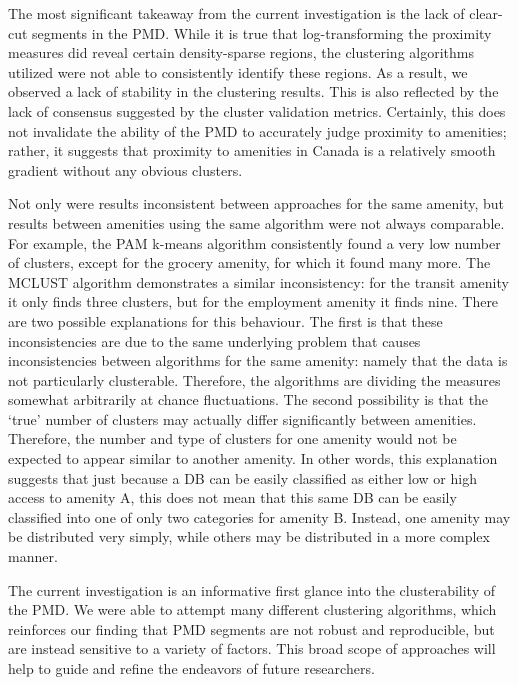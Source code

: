 \documentclass[11pt, a4paper]{article}
\begin{document}
The most significant takeaway from the current investigation is the lack of clear-cut segments in the PMD. While it is true that log-transforming the proximity measures did reveal certain density-sparse regions, the clustering algorithms utilized were not able to consistently identify these regions. As a result, we observed a lack of stability in the clustering results. This is also reflected by the lack of consensus suggested by the cluster validation metrics. Certainly, this does not invalidate the ability of the PMD to accurately judge proximity to amenities; rather, it suggests that proximity to amenities in Canada is a relatively smooth gradient without any obvious clusters.
\par
Not only were results inconsistent between approaches for the same amenity, but results between amenities using the same algorithm were not always comparable. For example, the PAM k-means algorithm consistently found a very low number of clusters, except for the grocery amenity, for which it found many more. The MCLUST algorithm demonstrates a similar inconsistency: for the transit amenity it only finds three clusters, but for the employment amenity it finds nine. There are two possible explanations for this behaviour. The first is that these inconsistencies are due to the same underlying problem that causes inconsistencies between algorithms for the same amenity: namely that the data is not particularly clusterable. Therefore, the algorithms are dividing the measures somewhat arbitrarily at chance fluctuations. The second possibility is that the `true' number of clusters may actually differ significantly between amenities. Therefore, the number and type of clusters for one amenity would not be expected to appear similar to another amenity. In other words, this explanation suggests that just because a DB can be easily classified as either low or high access to amenity A, this does not mean that this same DB can be easily classified into one of only two categories for amenity B. Instead, one amenity may be distributed very simply, while others may be distributed in a more complex manner.
\par
The current investigation is an informative first glance into the clusterability of the PMD. We were able to attempt many different clustering algorithms, which reinforces our finding that PMD segments are not robust and reproducible, but are instead sensitive to a variety of factors. This broad scope of approaches will help to guide and refine the endeavors of future researchers.
\par
\end{document}
